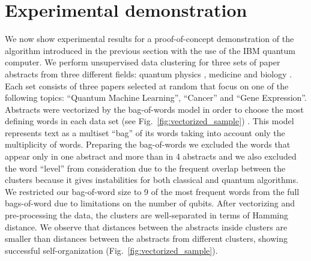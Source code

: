 \documentclass[pra,showkeys,twocolumn,showpacs,aps,10pt]{revtex4-2}
\begin{document}
























\section{Experimental demonstration}

We now show experimental results for a proof-of-concept demonstration of the algorithm introduced in the previous section with the use of the IBM quantum computer.  We perform unsupervised data clustering for three sets of paper abstracts from three different fields:
quantum physics \cite{qml0, qml1, qml2},
medicine \cite{med0, med1, med2}
and biology \cite{bio0, bio1, bio2}.
Each set consists of three papers selected at random that focus on one of the following topics:
``Quantum Machine Learning'',
``Cancer''
and ``Gene Expression''.
Abstracts were vectorized by the bag-of-words \cite{weikang2016} model in order to choose the most defining words in each data set (see Fig.~\ref{fig:vectorized_sample}) \cite{mctear2016}.
This model represents text as a multiset ``bag'' of its words taking into account only the multiplicity of words.
Preparing the bag-of-words we excluded the words that appear only in one abstract and more than in 4 abstracts and we also excluded the word ``level'' from consideration due to the frequent overlap between the clusters because it gives instabilities for both classical and quantum algorithms.
We restricted our bag-of-word size to 9 of the most frequent words from the full bags-of-word  due to limitations on the number of qubits.
After vectorizing and pre-processing  the data, the clusters are well-separated in terms of Hamming distance.
We observe that distances between the abstracts inside clusters are smaller than distances between the abstracts from different clusters,
showing successful self-organization (Fig.~\ref{fig:vectorized_sample}).
\end{document}
